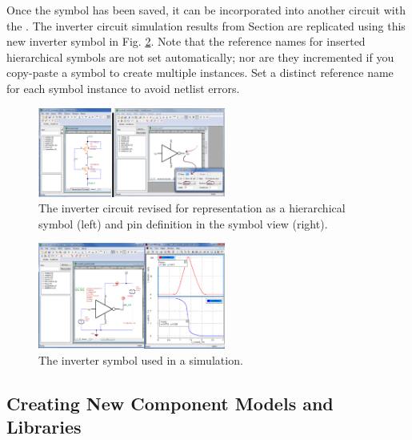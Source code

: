 Once the symbol has been saved, it can be incorporated into another circuit with the .   The inverter circuit simulation results from Section are replicated using this new inverter symbol in Fig. \ref{fig_usingsymbolincircuitexample}.  Note that the reference names for inserted hierarchical symbols are \textsf{not} set automatically; nor are they incremented if you copy-paste a symbol to create multiple instances.  Set a distinct reference name for each symbol instance to avoid netlist errors.

\begin{figure}[th]
  \centering
    \includegraphics[width=0.55\textwidth]{./figures/getting_started_figures/SchematicEditor_revisedcircuitandsymbol2.png}
    \caption{The inverter circuit revised for representation as a hierarchical symbol (left) and pin definition in the symbol view (right).}
  \label{fig_schematiceditor_symbolandcircuit}
\end{figure} 

\begin{figure}[hbt]
  \centering
    \includegraphics[width=0.55\textwidth]{./figures/getting_started_figures/CoolSPICE_invertersymbolincircuitexample2.png}
    \caption{The inverter symbol used in a simulation.}
  \label{fig_usingsymbolincircuitexample}
\end{figure} 

%
\subsection{Creating New Component Models and Libraries}

